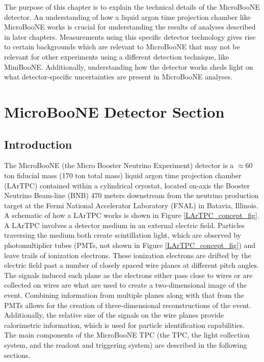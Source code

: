 The purpose of this chapter is to explain the technical details of the MicroBooNE detector. An understanding of how a liquid argon time projection chamber like MicroBooNE works is crucial for understanding the results of analyses described in later chapters. Measurements using this specific detector technology gives rise to certain backgrounds which are relevant to MicroBooNE that may not be relevant for other experiments using a different detection technique, like MiniBooNE. Additionally, understanding how the detector works sheds light on what detector-specific uncertainties are present in MicroBooNE analyses.

\section{MicroBooNE Detector Section}\label{UBDetectorSection}

\subsection{Introduction}
The MicroBooNE (the Micro Booster Neutrino Experiment) detector \cite{UBDetectorPaper} is a $\approx$60 ton fiducial mass (170 ton total mass) liquid argon time projection chamber (LArTPC) contained within a cylindrical cryostat, located on-axis the Booster Neutrino Beam-line (BNB) 470 meters downstream from the neutrino production target at the Fermi National Accelerator Laboratory (FNAL) in Batavia, Illinois. A schematic of how a LArTPC works is shown in Figure \ref{LArTPC_concept_fig}. A LArTPC involves a detector medium in an external electric field. Particles traversing the medium both create scintillation light, which are observed by photomultiplier tubes (PMTs, not shown in Figure \ref{LArTPC_concept_fig}) and leave trails of ionization electrons. These ionization electrons are drifted by the electric field past a number of closely spaced wire planes at different pitch angles. The signals induced each plane as the electrons either pass close to wires or are collected on wires are what are used to create a two-dimensional image of the event. Combining information from multiple planes along with that from the PMTs allows for the creation of three-dimensional reconstructions of the event. Additionally, the relative size of the signals on the wire planes provide calorimetric information, which is used for particle identification capabilities.\\

The main components of the MicroBooNE TPC (the TPC, the light collection system, and the readout and triggering system) are described in the following sections.

